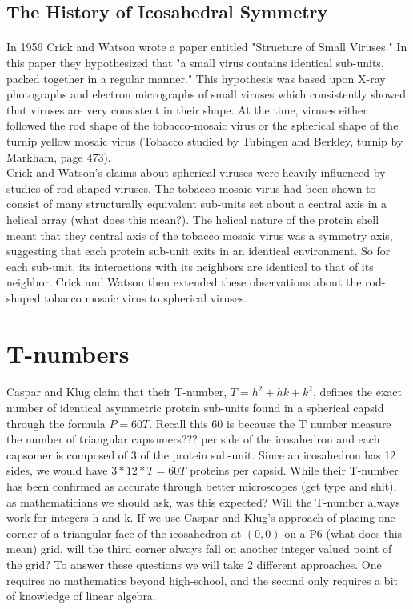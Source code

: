 \documentclass[12pt,letter]{article}
\begin{document}
\subsection{The History of Icosahedral Symmetry} %

\paragraph{}
In 1956 Crick and Watson wrote a paper entitled "Structure of Small Viruses." In this paper they hypothesized that "a small virus contains identical sub-units, packed together in a regular manner." This hypothesis was based upon X-ray photographs and electron micrographs of small viruses which consistently showed that viruses are very consistent in their shape. At the time, viruses either followed the rod shape of the tobacco-mosaic virus or the spherical shape of the turnip yellow mosaic virus (Tobacco studied by Tubingen and Berkley, turnip by Markham, page 473). \\

Crick and Watson's claims about spherical viruses were heavily influenced by studies of rod-shaped viruses. The tobacco mosaic virus had been shown to consist of many structurally equivalent sub-units set about a central axis in a helical array (what does this mean?). The helical nature of the protein shell meant that they central axis of the tobacco mosaic virus was a symmetry axis, suggesting that each protein sub-unit exits in an identical environment. So for each sub-unit, its interactions with its neighbors are identical to that of its neighbor. Crick and Watson then extended these observations about the rod-shaped tobacco mosaic virus to spherical viruses.


\section{T-numbers}
\paragraph{}
Caspar and Klug claim that their T-number, $T = h^2 + hk + k^2$, defines the exact number of identical asymmetric protein sub-units found in a spherical capsid through the formula $P = 60T$. Recall this 60 is because the T number measure the number of triangular capsomers??? per side of the icosahedron and each capsomer is composed of 3 of the protein sub-unit. Since an icosahedron has 12 sides, we would have $3*12*T = 60T$ proteins per capsid. While their T-number has been confirmed as accurate through better microscopes (get type and shit), as mathematicians we should ask, was this expected? Will the T-number always work for integers h and k. If we use Caspar and Klug's approach of placing one corner of a triangular face of the icosahedron at $(0,0)$ on a P6 (what does this mean) grid, will the third corner always fall on another integer valued point of the grid? To answer these questions we will take 2 different approaches. One requires no mathematics beyond high-school, and the second only requires a bit of knowledge of linear algebra.
\end{document}
